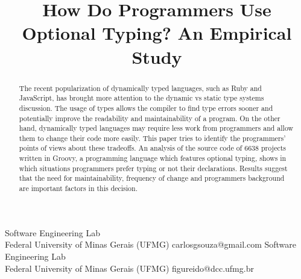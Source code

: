 \documentclass[preprint]{sigplanconf}
\begin{document}
\setlength{\pdfpageheight}{\paperheight}
\setlength{\pdfpagewidth}{\paperwidth}






\title{How Do Programmers Use Optional Typing? An Empirical Study}

           {Software Engineering Lab\\Federal University of Minas Gerais (UFMG)}
           {carlosgsouza@gmail.com}
           {Software Engineering Lab\\Federal University of Minas Gerais (UFMG)}
           {figureido@dcc.ufmg.br}

\maketitle

\begin{abstract}
The recent popularization of dynamically typed languages, such as Ruby and JavaScript, has brought more attention to the dynamic vs static type systems discussion.
The usage of types allows the compiler to find type errors sooner and potentially improve the readability and maintainability of a program.
On the other hand, dynamically typed languages may require less work from programmers and allow them to change their code more easily.
This paper tries to identify the programmers' points of views about these tradeoffs.
An analysis of the source code of 6638 projects written in Groovy, a programming language which features optional typing, shows in which situations programmers prefer typing or not their declarations. 
Results suggest that the need for maintainability, frequency of change and programmers background are important factors in this decision.
\end{abstract}
\end{document}
